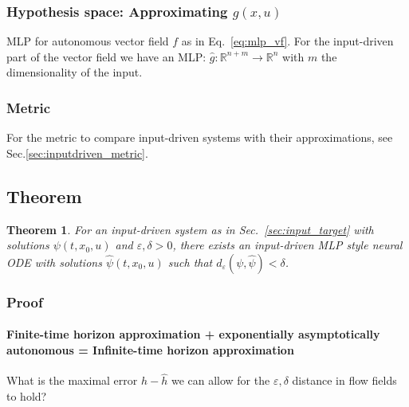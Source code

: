 \documentclass{article}
\newtheorem{theorem}{Theorem}
\theoremstyle{definition} \newtheorem{definition}{Definition}
\theoremstyle{remark} \newtheorem{remark}{Remark}
\newcommand{\reals}{\mathbb{R}}
\newcounter{ct}
\begin{document}


\subsubsection{Hypothesis space: Approximating $g(x,u)$}\label{sec:input_hypothesis} %
MLP for autonomous vector field $f$ as in Eq.~\ref{eq:mlp_vf}.
For the input-driven part of the vector field we have an MLP:
 $\hat g\colon \reals^{n+m} \rightarrow \reals^{n}$ with $m$ the dimensionality of the input.


\subsubsection{Metric}\label{sec:input_metric} 
For the metric to compare input-driven systems with their approximations, see Sec.\ref{sec:inputdriven_metric}.




\subsection{Theorem}
\begin{theorem}
For an input-driven system as in Sec.~\ref{sec:input_target} %
with solutions  $\psi(t,x_0,u)$
and $\varepsilon, \delta>0$, there exists an input-driven MLP style neural ODE %
with solutions  $\hat \psi(t,x_0,u)$ such that 
$d_\varepsilon(\psi,\hat\psi)<\delta$.
\end{theorem}


\subsubsection{Proof}
\paragraph{Finite-time horizon approximation + exponentially asymptotically autonomous = Infinite-time horizon approximation}
What is the maximal error $h-\hat h$ we can allow for the $\varepsilon,\delta$ distance in flow fields to hold?
\end{document}
